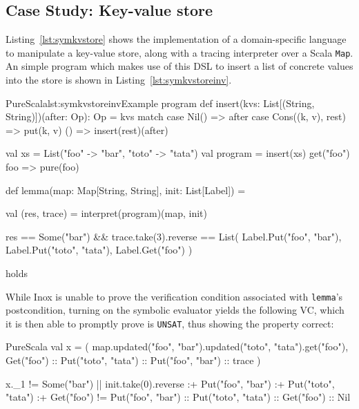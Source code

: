 \documentclass[a4paper,twoside]{article}
\newcommand{\RefCode}[1]{Listing~\ref{#1}}
\newcommand{\stt}[1]{\texttt{\small{#1}}}
\begin{document}
\subsection{Case Study: Key-value store}
\label{symcases}

\RefCode{lst:symkvstore} shows the implementation of a domain-specific language to manipulate a key-value store, along with a tracing interpreter over a Scala \stt{Map}. An simple program which makes use of this DSL to insert a list of concrete values into the store is shown in \RefCode{lst:symkvstoreinv}.

\begin{Code}{PureScala}{lst:symkvstoreinv}{Example program}
def insert(kvs: List[(String, String)])(after: Op): Op = kvs match {
  case Nil() => after
  case Cons((k, v), rest) => put(k, v) { () => insert(rest)(after) }
}

val xs = List("foo" -> "bar", "toto" -> "tata")
val program = insert(xs) {
  get("foo") { foo =>
    pure(foo)
  }
}

def lemma(map: Map[String, String], init: List[Label]) = {
  val (res, trace) = interpret(program)(map, init)

  res == Some("bar") &&
  trace.take(3).reverse == List(
    Label.Put("foo", "bar"),
    Label.Put("toto", "tata"),
    Label.Get("foo")
  )
} holds
\end{Code}

While Inox is unable to prove the verification condition associated with \stt{lemma}'s postcondition, turning on the symbolic evaluator yields the following VC, which it is then able to promptly prove is \texttt{UNSAT}, thus showing the property correct:

\begin{ShortCode}{PureScala}
val x = (
  map.updated("foo", "bar").updated("toto", "tata").get("foo"),
  Get("foo") :: Put("toto", "tata") :: Put("foo", "bar") :: trace
)

x._1 != Some("bar") || {
  init.take(0).reverse :+ Put("foo", "bar") :+ Put("toto", "tata") :+ Get("foo")
  !=
  Put("foo", "bar") :: Put("toto", "tata") :: Get("foo") :: Nil
}
\end{ShortCode}

\end{document}
